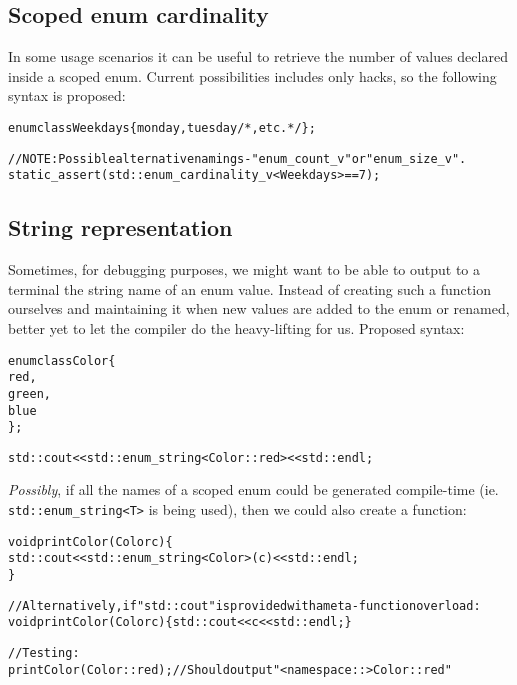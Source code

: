 \documentclass[a4paper, 12pt]{article}
\begin{document}
\subsection{Scoped enum cardinality}

In some usage scenarios it can be useful to retrieve the number of values
declared inside a scoped enum. Current possibilities includes only hacks,
so the following syntax is proposed:

\begin{alltt}\footnotesize
enum class Weekdays \{ monday, tuesday /*, etc. */ \};

// NOTE: Possible alternative namings - "enum\_count\_v" or "enum\_size\_v".
static\_assert(std::enum\_cardinality\_v<Weekdays> == 7);
\end{alltt}



\subsection{String representation}

Sometimes, for debugging purposes, we might want to be able to output to a
terminal the string name of an enum value. Instead of creating such a function
ourselves and maintaining it when new values are added to the enum or renamed,
better yet to let the compiler do the heavy-lifting for us. Proposed syntax:

\begin{alltt}\footnotesize
enum class Color \{
  red,
  green,
  blue
\};

std::cout << std::enum\_string<Color::red> << std::endl;
\end{alltt}

\noindent
\textit{Possibly}, if all the names of a scoped enum could be generated
compile-time (ie. \texttt{std::enum\_string<T>} is being used), then we could
also create a function:

\begin{alltt}\footnotesize
void printColor(Color c) \{
  std::cout << std::enum\_string<Color>(c) << std::endl;
\}

// Alternatively, if "std::cout" is provided with a meta-function overload:
void printColor(Color c) \{ std::cout << c << std::endl; \}

// Testing:
printColor(Color::red); // Should output "<namespace::>Color::red"
\end{alltt}
\end{document}
